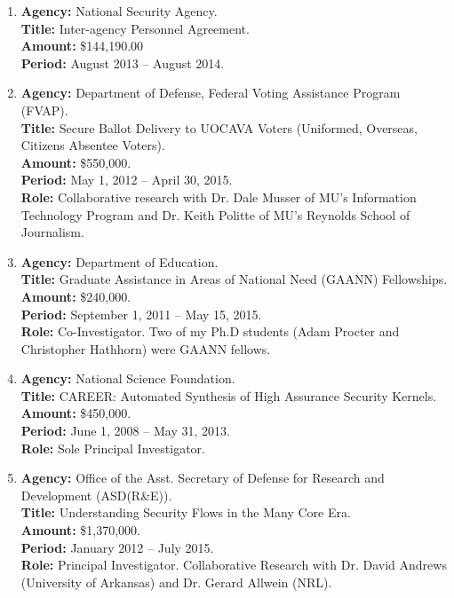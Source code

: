 \documentclass[11pt]{article}
\begin{document}
\begin{enumerate}[leftmargin=0.0mm,resume]
\item  {\bf Agency:} National Security Agency.\\
               {\bf Title:} Inter-agency Personnel Agreement.\\
               {\bf Amount:} \$144,190.00 \\
               {\bf Period:} August 2013 -- August 2014.

\item
{\bf Agency:} Department of Defense, Federal Voting Assistance Program (FVAP).
\\
{\bf Title:} Secure Ballot Delivery to UOCAVA Voters (Uniformed, Overseas, Citizens Absentee Voters). 
\\
{\bf Amount:} \$550,000.
\\
{\bf Period:} May 1, 2012 -- April 30, 2015.
\\
{\bf Role:} Collaborative research with Dr. Dale Musser of MU's Information Technology Program and Dr. Keith Politte of MU's Reynolds School of Journalism. 

\item
{\bf Agency:} Department of Education.
 ~\\
{\bf Title:} Graduate Assistance in Areas of National Need (GAANN) Fellowships.
\\
{\bf Amount:} \$240,000.
\\
{\bf Period:} September 1, 2011 -- May 15, 2015.
\\
{\bf Role:} Co-Investigator. Two of my Ph.D students (Adam Procter and Christopher Hathhorn) were GAANN fellows. 

\item
{\bf Agency:} National Science Foundation.
\\
{\bf Title:} CAREER: Automated Synthesis of High Assurance Security Kernels.
\\
{\bf Amount:} \$450,000.
\\
{\bf Period:}   June 1, 2008  --  May 31, 2013.
\\
{\bf Role:}      Sole Principal Investigator.

\item
{\bf Agency:} Office of the Asst. Secretary of Defense for Research and Development (ASD(R\&E)).
\\
{\bf Title:} Understanding Security Flows in the Many Core Era.
\\
{\bf Amount:} \$1,370,000.
\\
{\bf Period:}   January 2012  --  July 2015.
\\
{\bf Role:}      Principal Investigator. Collaborative Research with Dr. David Andrews (University of Arkansas) and Dr. Gerard Allwein (NRL).


\end{enumerate}
\end{document}
